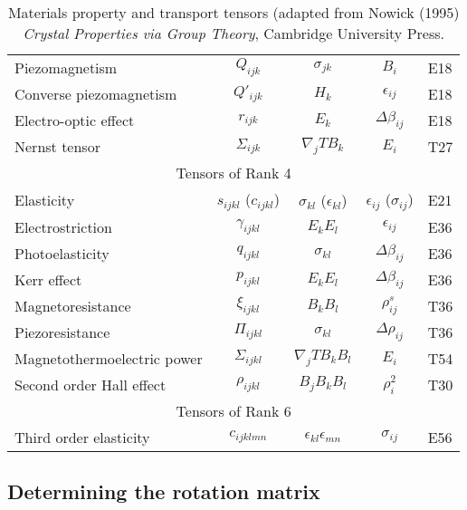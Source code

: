 \begin{table}
\begin{tabular}{|l|c|c|c|l|}
Piezomagnetism &  $Q_{ijk}$  & $\sigma_{jk}$ & $B_i$ & E18\\
Converse piezomagnetism &  $Q'_{ijk}$  & $H_{k}$ & $\epsilon_{ij}$ & E18\\
Electro-optic effect & $r_{ijk}$  & $E_k$ & $\Delta\beta_{ij}$&  E18\\
Nernst tensor & $\Sigma_{ijk}$ & $\nabla_j T B_k$ & $E_i$ & T27\\
\hline
\multicolumn{5}{|c|}{Tensors of Rank 4}\\
\hline
Elasticity  &  $s_{ijkl}$ ($c_{ijkl}$) & $\sigma_{kl}$ ($\epsilon_{kl}$) & $\epsilon_{ij}$ ($\sigma_{ij}$) & E21\\
Electrostriction & $\gamma_{ijkl}$  & $E_kE_l$ & $\epsilon_{ij}$ & E36\\
Photoelasticity & $q_{ijkl}$  & $\sigma_{kl}$ & $\Delta\beta_{ij}$ & E36\\
Kerr effect & $p_{ijkl}$ & $E_kE_l$ & $\Delta\beta_{ij}$& E36\\
Magnetoresistance & $\xi_{ijkl}$ & $B_kB_l$ & $\rho^s_{ij}$ & T36\\
Piezoresistance & $\Pi_{ijkl}$ & $\sigma_{kl}$ & $\Delta \rho_{ij}$ & T36\\
Magnetothermoelectric power & $\Sigma_{ijkl}$ & $\nabla_j T B_k B_l$ & $E_i$ & T54\\
Second order Hall effect & $\rho_{ijkl}$ & $B_jB_kB_l$ & $\rho^2_i$ & T30\\
\hline
\multicolumn{5}{|c|}{Tensors of Rank 6}\\
\hline
Third order elasticity & $c_{ijklmn}$  & $\epsilon_{kl}\epsilon_{mn}$ & $\sigma_{ij}$ & E56\\
\hline
\end{tabular}
\caption{Materials property and transport tensors (adapted from Nowick (1995) \textit{Crystal Properties 
via Group Theory}, Cambridge University Press.}
\label{tensors}
\end{table}


\subsection{Determining the rotation matrix\label{ssec:rotationmatrixdetermination}}


